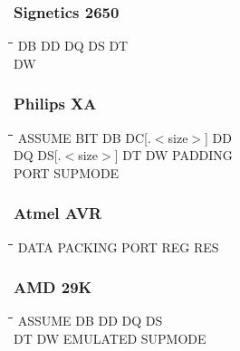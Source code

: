 \subsubsection{Signetics 2650}
{\tt\begin{tabbing}
\hspace{3cm}\=\hspace{3cm}\=\hspace{3cm}\=\hspace{3cm}\=\kill
DB         \> DD          \> DQ          \> DS          \> DT \\
DW         \\
\end{tabbing}}

\subsubsection{Philips XA}
{\tt\begin{tabbing}
\hspace{3cm}\=\hspace{3cm}\=\hspace{3cm}\=\hspace{3cm}\=\kill
ASSUME     \> BIT         \> DB          \> DC[.$<$size$>$] \> DD \\
DQ         \> DS[.$<$size$>$] \> DT      \> DW          \> PADDING \\
PORT       \> SUPMODE \\
\end{tabbing}}

\subsubsection{Atmel AVR}
{\tt\begin{tabbing}
\hspace{3cm}\=\hspace{3cm}\=\hspace{3cm}\=\hspace{3cm}\=\kill
DATA       \> PACKING     \> PORT        \> REG         \> RES \\
\end{tabbing}}

\subsubsection{AMD 29K}
{\tt\begin{tabbing}
\hspace{3cm}\=\hspace{3cm}\=\hspace{3cm}\=\hspace{3cm}\=\kill
ASSUME     \> DB          \> DD          \> DQ          \> DS \\
DT         \> DW          \> EMULATED    \> SUPMODE \\
\end{tabbing}}

